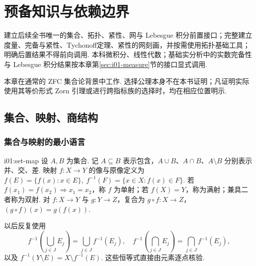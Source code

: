 \chapter{预备知识与依赖边界}\label{chap:I-01}
\FAChapterOpening
{建立后续全书唯一的集合、拓扑、紧性、网与 Lebesgue 积分前置接口；完整建立度量、完备与紧性、Tychonoff定理、紧性的网刻画，并按需使用拓扑基础工具；明确后置结果不得前向调用.}
{本科微积分、线性代数；基础实分析中的实数完备性与 Lebesgue 积分结果按本章第\ref{sec:i01-measure}节的接口显式调用.}
{\centering
{}}

本章在通常的 ZFC 集合论背景中工作. 选择公理本身不在本书证明；凡证明实际使用其等价形式 Zorn 引理或进行跨指标族的选择时，均在相应位置明示.

\section{集合、映射、商结构}\label{sec:i01-sets}

\subsection{集合与映射的最小语言}

\begin{FADefinition}[C][集合与映射]{i01:set-map}
设 \(\displaystyle A,B\) 为集合. 记 \(\displaystyle A\subseteq B\) 表示包含，\(\displaystyle A\cup B\)、\(\displaystyle A\cap B\)、\(\displaystyle A\setminus B\) 分别表示并、交、差. 映射 \(\displaystyle f:X\to Y\) 的像与原像定义为 \(\displaystyle f(E)=\{f(x):x\in E\},\; f^{-1}(F)=\{x\in X:f(x)\in F\}\).
若 \(\displaystyle f(x_1)=f(x_2)\Rightarrow x_1=x_2\)，称 \(\displaystyle f\) 为单射；若 \(\displaystyle f(X)=Y\)，称为满射；兼具二者称为双射. 对 \(\displaystyle f:X\to Y\) 与 \(\displaystyle g:Y\to Z\)，复合为 \(\displaystyle g\circ f:X\to Z\)，\(\displaystyle (g\circ f)(x)=g(f(x))\).
\end{FADefinition}

以后反复使用
\[
f^{-1}\!\left(\bigcup_{j\in J}E_j\right)=\bigcup_{j\in J}f^{-1}(E_j),\quad
f^{-1}\!\left(\bigcap_{j\in J}E_j\right)=\bigcap_{j\in J}f^{-1}(E_j),
\]
以及 \(\displaystyle f^{-1}(Y\setminus E)=X\setminus f^{-1}(E)\). 这些恒等式直接由元素逐点核验.

